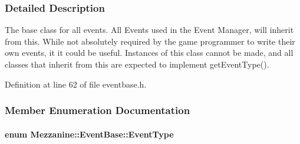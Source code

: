 \subsubsection{Detailed Description}
The base class for all events. All Events used in the Event Manager, will inherit from this. While not absolutely required by the game programmer to write their own events, it it could be useful. Instances of this class cannot be made, and all classes that inherit from this are expected to implement getEventType(). 

Definition at line 62 of file eventbase.h.



\subsubsection{Member Enumeration Documentation}
\hypertarget{classMezzanine_1_1EventBase_ab85e31e97753b7e7ecb098f82526baef}{
\paragraph[{EventType}]{\setlength{\rightskip}{0pt plus 5cm}enum {\bf Mezzanine::EventBase::EventType}}\hfill}
\label{classMezzanine_1_1EventBase_ab85e31e97753b7e7ecb098f82526baef}
